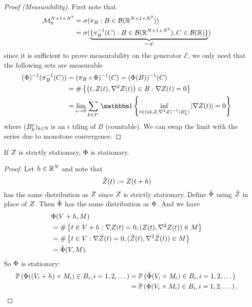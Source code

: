 \begin{proof}[Proof (Measurability)]
	First note that	
	\begin{align*}
		\locFiniteMeasAlg[\dimension+1+\dimension^2]
		&= \sigma(\pi_B : B\in\borel(\real^{\dimension+1+\dimension^2}))\\
		&=\sigma(\underbrace{
			\{\pi_B^{-1}(C) : B\in\borel(\real^{\dimension+1+\dimension^2}), C\in\borel(\real)\}
		}_{=:\mathcal{E}}
		)
	\end{align*}
	since it is sufficient to prove measurability on the generator
	\(\mathcal{E}\), we only need that the following sets are measurable
	\begin{align*}
		(\crit)^{-1}(\pi^{-1}_{B}(C))
		&= (\pi_{B} \circ \crit)^{-1}(C)
		= (\crit(B))^{-1}(C)\\
		&= \#\left\{\left(t,\rf(t),\nabla^2\rf(t)\right) \in B:
			\nabla\rf(t)=0
		\right\}\\
		&= \lim_{\epsilon\to 0} \sum_{k\in I^\epsilon}
		\ind\left\{
			\inf_{t\in \left(\text{id}, \rf, \nabla^2\rf\right)^{-1}(B^\epsilon_k) }
		|\nabla \rf(t)| = 0
		\right\}
	\end{align*}
	where \((B^\epsilon_k)_{k\in\nat}\) is an \(\epsilon\) tiling of \(B\) (countable).
	We can swap the limit with the series due to monotone convergence.
\end{proof}

\begin{lemma}[Stationarity]
	If \(\rf\) is strictly stationary, \(\crit\) is stationary.
\end{lemma}
\begin{proof}
	Let \(h\in \real^\dimension\) and note that
	\[
		\tilde{\rf}(t) := \rf(t+h)
	\]
	has the same distribution as \(\rf\) since \(\rf\) is strictly stationary. Define
	\(\tilde{\crit}\) using \(\tilde{\rf}\) in place of \(\rf\). Then
	\(\tilde{\crit}\) has the same distribution as \(\crit\).
	And we have
	\begin{align*}
		&\crit(\Vol+h, M)\\
		&= \#\left\{t\in\Vol+h:
			\nabla\rf(t)=0,
			(\rf(t),\nabla^2\rf(t))\in M
		\right\}\\
		&= \#\left\{t\in\Vol:
			\nabla\tilde{\rf}(t)=0,
			(\tilde{\rf}(t),\nabla^2\tilde{\rf}(t))\in M
		\right\}\\
		&= \tilde{\crit}(\Vol, M).
	\end{align*}
	So \(\crit\) is stationary:
	\begin{align*}
		\Pr\left(\crit((\Vol_i+h)\times M_i)\in B_i, i=1,2,\dots\right)
		&= \Pr\left(\tilde{\crit}(\Vol_i\times M_i)\in B_i, i=1,2,\dots\right)\\
		&= \Pr\left(\crit(\Vol_i\times M_i)\in B_i, i=1,2,\dots\right).
		\qedhere
	\end{align*}
\end{proof}


